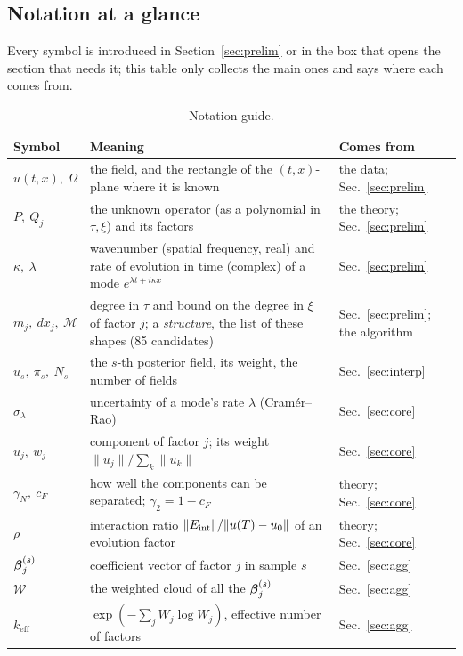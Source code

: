 \subsection{Notation at a glance}
Every symbol is introduced in Section~\ref{sec:prelim} or in the box that opens the section that needs it; this table only collects the main ones and says where each comes from.
\begin{table}[!htb]
\centering\small
\begin{tabular}{@{}L{2.9cm}L{7.0cm}L{3.0cm}@{}}
\toprule
Symbol & Meaning & Comes from\\\midrule
$u(t,x),\ \Omega$ & the field, and the rectangle of the $(t,x)$-plane where it is known & the data; Sec.~\ref{sec:prelim}\\
$P,\ Q_j$ & the unknown operator (as a polynomial in $\tau,\xi$) and its factors & the theory; Sec.~\ref{sec:prelim}\\
$\kappa,\ \lambda$ & wavenumber (spatial frequency, real) and rate of evolution in time (complex) of a mode $e^{\lambda t+i\kappa x}$ & Sec.~\ref{sec:prelim}\\
$m_j,\ dx_j,\ \mathcal M$ & degree in $\tau$ and bound on the degree in $\xi$ of factor $j$; a \emph{structure}, the list of these shapes (85 candidates) & Sec.~\ref{sec:prelim}; the algorithm\\
$\hat u_s,\ \pi_s,\ N_s$ & the $s$-th posterior field, its weight, the number of fields & Sec.~\ref{sec:interp}\\
$\sigma_\lambda$ & uncertainty of a mode's rate $\lambda$ (Cram\'er--Rao) & Sec.~\ref{sec:core}\\
$u_j,\ w_j$ & component of factor $j$; its weight $\|u_j\|/\sum_k\|u_k\|$ & Sec.~\ref{sec:core}\\
$\gamma_N,\ c_F$ & how well the components can be separated; $\gamma_2=1-c_F$ & theory; Sec.~\ref{sec:core}\\
$\rho$ & interaction ratio $\|E_{\mathrm{int}}\|/\|u(T)-u_0\|$ of an evolution factor & theory; Sec.~\ref{sec:core}\\
$\boldsymbol\beta^{(s)}_j$ & coefficient vector of factor $j$ in sample $s$ & Sec.~\ref{sec:agg}\\
$\mathcal W$ & the weighted cloud of all the $\boldsymbol\beta^{(s)}_j$ & Sec.~\ref{sec:agg}\\
$k_{\mathrm{eff}}$ & $\exp(-\sum_jW_j\log W_j)$, effective number of factors & Sec.~\ref{sec:agg}\\
\bottomrule
\end{tabular}
\caption{Notation guide.}
\end{table}

